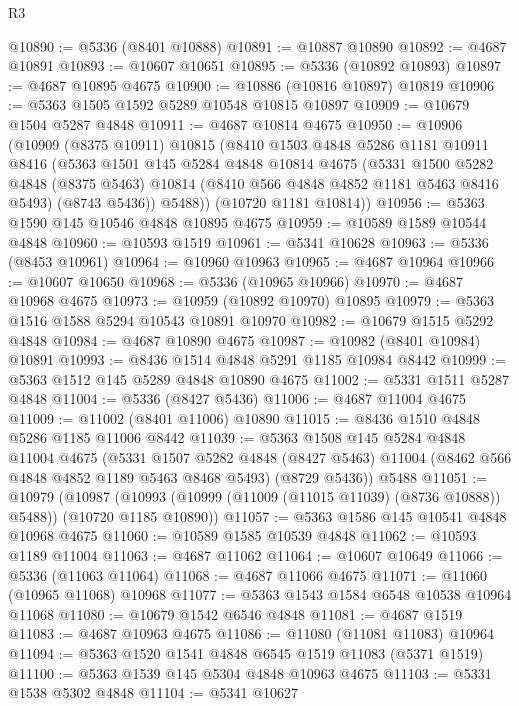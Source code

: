 \begin{lexlean}{R3}
\begin{coremodule}
@10890 := @5336 (@8401 @10888)
@10891 := @10887 @10890
@10892 := @4687 @10891
@10893 := @10607 @10651
@10895 := @5336 (@10892 @10893)
@10897 := @4687 @10895 @4675
@10900 := @10886 (@10816 @10897) @10819
@10906 := @5363 @1505 @1592 @5289 @10548 @10815 @10897
@10909 := @10679 @1504 @5287 @4848
@10911 := @4687 @10814 @4675
@10950 := @10906
    (@10909
      (@8375 @10911)
      @10815
      (@8410
        @1503
        @4848
        @5286
        @1181
        @10911
        @8416
        (@5363
          @1501
          @145
          @5284
          @4848
          @10814
          @4675
          (@5331
            @1500
            @5282
            @4848
            (@8375 @5463)
            @10814
            (@8410 @566 @4848 @4852 @1181 @5463 @8416 @5493)
            (@8743 @5436))
          @5488))
      (@10720 @1181 @10814))
@10956 := @5363 @1590 @145 @10546 @4848 @10895 @4675
@10959 := @10589 @1589 @10544 @4848
@10960 := @10593 @1519
@10961 := @5341 @10628
@10963 := @5336 (@8453 @10961)
@10964 := @10960 @10963
@10965 := @4687 @10964
@10966 := @10607 @10650
@10968 := @5336 (@10965 @10966)
@10970 := @4687 @10968 @4675
@10973 := @10959 (@10892 @10970) @10895
@10979 := @5363 @1516 @1588 @5294 @10543 @10891 @10970
@10982 := @10679 @1515 @5292 @4848
@10984 := @4687 @10890 @4675
@10987 := @10982 (@8401 @10984) @10891
@10993 := @8436 @1514 @4848 @5291 @1185 @10984 @8442
@10999 := @5363 @1512 @145 @5289 @4848 @10890 @4675
@11002 := @5331 @1511 @5287 @4848
@11004 := @5336 (@8427 @5436)
@11006 := @4687 @11004 @4675
@11009 := @11002 (@8401 @11006) @10890
@11015 := @8436 @1510 @4848 @5286 @1185 @11006 @8442
@11039 := @5363
    @1508
    @145
    @5284
    @4848
    @11004
    @4675
    (@5331
      @1507
      @5282
      @4848
      (@8427 @5463)
      @11004
      (@8462 @566 @4848 @4852 @1189 @5463 @8468 @5493)
      (@8729 @5436))
    @5488
@11051 := @10979
    (@10987 (@10993 (@10999 (@11009 (@11015 @11039) (@8736 @10888)) @5488)) (@10720 @1185 @10890))
@11057 := @5363 @1586 @145 @10541 @4848 @10968 @4675
@11060 := @10589 @1585 @10539 @4848
@11062 := @10593 @1189 @11004
@11063 := @4687 @11062
@11064 := @10607 @10649
@11066 := @5336 (@11063 @11064)
@11068 := @4687 @11066 @4675
@11071 := @11060 (@10965 @11068) @10968
@11077 := @5363 @1543 @1584 @6548 @10538 @10964 @11068
@11080 := @10679 @1542 @6546 @4848
@11081 := @4687 @1519
@11083 := @4687 @10963 @4675
@11086 := @11080 (@11081 @11083) @10964
@11094 := @5363 @1520 @1541 @4848 @6545 @1519 @11083 (@5371 @1519)
@11100 := @5363 @1539 @145 @5304 @4848 @10963 @4675
@11103 := @5331 @1538 @5302 @4848
@11104 := @5341 @10627

\end{coremodule}
\end{lexlean}
